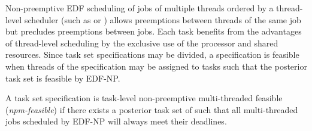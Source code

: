 Non-preemptive EDF scheduling of jobs of multiple threads ordered by a
thread-level scheduler (such as \bundle{} or \bundlep{}) allows
preemptions between threads of the same job but precludes preemptions
between jobs. Each task benefits from the advantages of thread-level
scheduling by the exclusive use of the processor and shared
resources. Since task set specifications may be divided, a
specification is feasible when threads of the specification \ants{}
may be assigned to tasks such that the posterior task set \tasks{} is
feasible by EDF-NP. 

\begin{definition}
  A task set specification \ants{} is task-level non-preemptive
  multi-threaded feasible (\emph{npm-feasible}) if there exists a
  posterior task set \tasks{} of \ants{} such that all multi-threaded
  jobs scheduled by EDF-NP will always meet their deadlines. 
\end{definition}
